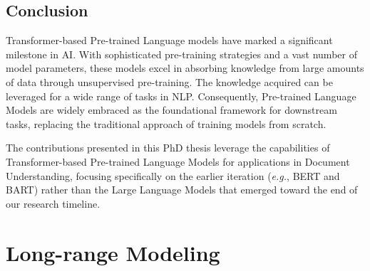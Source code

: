 

\subsection{Conclusion}

Transformer-based Pre-trained Language models have marked a significant milestone in \ac{AI}. With sophisticated pre-training strategies and a vast number of model parameters, these models excel in absorbing knowledge from large amounts of data through unsupervised pre-training. The knowledge acquired can be leveraged for a wide range of tasks in \ac{NLP}. Consequently, Pre-trained Language Models are widely embraced as the foundational framework for downstream tasks, replacing the traditional approach of training models from scratch. 

The contributions presented in this PhD thesis leverage the capabilities of Transformer-based Pre-trained Language Models for applications in Document Understanding, focusing specifically on the earlier iteration (\textit{e.g.}, \ac{BERT} and \ac{BART}) rather than the Large Language Models that emerged toward the end of our research timeline.

\section{Long-range Modeling}
\label{section:related-pretrained-language-models-long-range}

